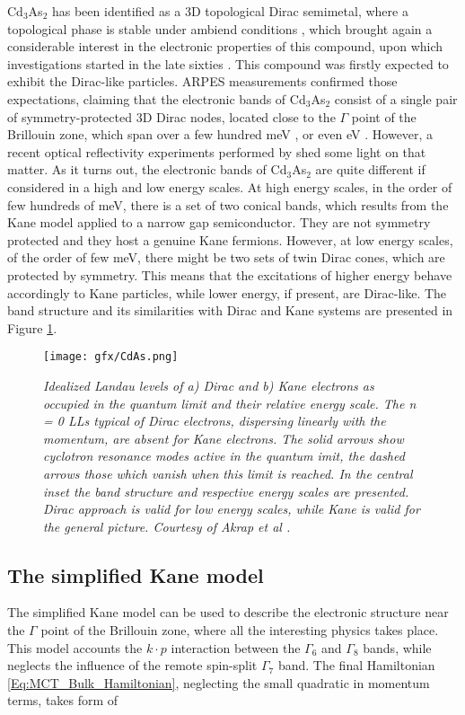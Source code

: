 \documentclass[titlepage,a4paper]{book}
\newcommand{\wciecie}{\quad\phantom{v}}
\begin{document}
Cd$_3$As$_2$ has been identified as a 3D topological Dirac semimetal, where a topological phase is stable under ambiend conditions \cite{Liu_CdAs}, which brought again a considerable interest in the electronic properties of this compound, upon which investigations started in the late sixties \cite{Roseman_CdAs}\cite{Bodnar_CdAs}. This compound was firstly expected to exhibit the Dirac-like particles. ARPES measurements confirmed those expectations, claiming that the electronic bands of Cd$_3$As$_2$ consist of a single pair of symmetry-protected 3D Dirac nodes, located close to the $\Gamma$ point of the Brillouin zone, which span over a few hundred meV \cite{Borisenko_CdAs}\cite{Neupane_CdAs}, or even eV \cite{Liu_CdAs}. However, a recent optical reflectivity experiments performed by \cite{Akrap_CdAs} shed some light on that matter. As it turns out, the electronic bands of Cd$_3$As$_2$ are quite different if considered in a high and low energy scales. At high energy scales, in the order of few hundreds of meV, there is a set of two conical bands, which results from the Kane model applied to a narrow gap semiconductor. They are not symmetry protected and they host a genuine Kane fermions. However, at low energy scales, of the order of few meV, there might be two sets of twin Dirac cones, which are protected by symmetry. This means that the excitations of higher energy behave accordingly to Kane particles, while lower energy, if present, are Dirac-like. The band structure and its similarities with Dirac and Kane systems are presented in Figure \ref{fig:CdAs_bandStructure}. 

\begin{figure}[ht]
	\centering
	\texttt{[image: gfx/CdAs.png]}
	\vspace{-10pt}
	\caption{\textit{Idealized Landau levels of a) Dirac and b) Kane electrons as occupied in the quantum limit and their relative energy scale. The n = 0 LLs typical of Dirac electrons, dispersing linearly with the momentum, are absent for Kane electrons. The solid arrows show cyclotron resonance modes active in the quantum imit, the dashed arrows those which vanish when this limit is reached. In the central inset the band structure and respective energy scales are presented. Dirac approach is valid for low energy scales, while Kane is valid for the general picture. Courtesy of Akrap et al \cite{Akrap_CdAs}.}}
	\label{fig:CdAs_bandStructure}
\end{figure} 

\subsection{The simplified Kane model}
\wciecie
The simplified Kane model \cite{Kane_MCT}\cite{Kane_Model} can be used to describe the electronic structure near the $\Gamma$ point of the Brillouin zone, where all the interesting physics takes place. This model accounts the $k\cdot p$ interaction between the $\Gamma_6$ and $\Gamma_8$ bands, while neglects the influence of the remote spin-split $\Gamma_7$ band. The final Hamiltonian \ref{Eq:MCT_Bulk_Hamiltonian}, neglecting the small quadratic in momentum terms, takes form of
\end{document}
